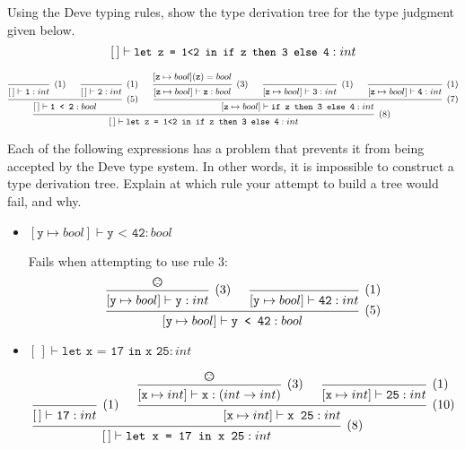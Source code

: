 \documentclass[addpoints]{exam}
\newcommand{\TJDG}[3]{#1 \vdash #2 : #3}
\begin{document}
\begin{questions}
  \question
  Using the Deve typing rules,
  show the type derivation tree for the type judgment
  given below.
  \[
  \small
  \TJDG{[\,]}{\texttt{let z = 1<2 in if z then 3 else 4}}{int} 
  \]

  \begin{solutionbox}{3cm}
    \[
    \small
    \begin{prooftree}
          \infer0[(1)]{\TJDG{[\,]}{\texttt{1}}{int}}
          \infer0[(1)]{\TJDG{[\,]}{\texttt{2}}{int}}
        \infer2[(5)]{\TJDG{[\,]}{\texttt{1 < 2}}{bool}}
            \hypo{[\texttt{z}\mapsto bool](\texttt{z}) = bool}  
          \infer1[(3)]{\TJDG{[\texttt{z}\mapsto bool]}{\texttt{z}}{bool}}
          \infer0[(1)]{\TJDG{[\texttt{z}\mapsto bool]}{\texttt{3}}{int}}
          \infer0[(1)]{\TJDG{[\texttt{z}\mapsto bool]}{\texttt{4}}{int}}
        \infer3[(7)]{\TJDG{[\texttt{z}\mapsto bool]}{\texttt{if z then 3 else 4}}{int}}
      \infer2[(8)]{\TJDG{[\,]}{\texttt{let z = 1<2 in if z then 3 else 4}}{int}}
    \end{prooftree}
    \]
  \end{solutionbox}

  \question
  Each of the following expressions has a problem that prevents it from being 
  accepted by the Deve type system. In other words, it is impossible 
  to construct a type derivation tree. Explain at which rule your attempt to
  build a tree would fail, and why.

  \begin{itemize}
  \item $\TJDG{[\texttt{y}\mapsto bool]}{\texttt{y < 42}}{bool}$
    \begin{solutionbox}{3cm}
      Fails when attempting to use rule 3:
      \[
      \begin{prooftree}
          \hypo{\textrm{\normalsize\Frowny}}
          \infer1[(3)]{\TJDG{[\texttt{y}\mapsto bool]}{\texttt{y}}{int}}
          \infer0[(1)]{\TJDG{[\texttt{y}\mapsto bool]}{\texttt{42}}{int}}
        \infer2[(5)]{\TJDG{[\texttt{y}\mapsto bool]}{\texttt{y < 42}}{bool}}
      \end{prooftree}
      \]
    \end{solutionbox}

  \item $\TJDG{[\,]}{\texttt{let x = 17 in x 25}}{int}$
    \begin{solutionbox}{3.5cm}
      \[
      \begin{prooftree}
          \infer0[(1)]{\TJDG{[\,]}{\texttt{17}}{int}}
             \hypo{\textrm{\normalsize\Frowny}}
            \infer1[(3)]{\TJDG{[\texttt{x}\mapsto int]}{\texttt{x}}{(int \to int)}}
            \infer0[(1)]{\TJDG{[\texttt{x}\mapsto int]}{\texttt{25}}{int}}
          \infer2[(10)]{\TJDG{[\texttt{x}\mapsto int]}{\texttt{x 25}}{int}}
        \infer2[(8)]{\TJDG{[\,]}{\texttt{let x = 17 in x 25}}{int}}
      \end{prooftree}
      \]
    \end{solutionbox}


\end{itemize}
\end{questions}
\end{document}
